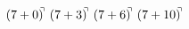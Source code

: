 \documentclass[preview]{standalone}
\begin{document}
\begin{align*}
(7+0)^{\hspace{-0.1cm}\urcorner} \ (7+3)^{\hspace{-0.1cm}\urcorner} \ (7+6)^{\hspace{-0.1cm}\urcorner} \ (7+10)^{\hspace{-0.1cm}\urcorner}
\end{align*}
\end{document}
